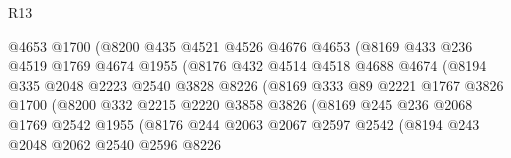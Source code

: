 \begin{lexlean}{R13}
\begin{coremodule}
                            @4653
                            @1700
                            (@8200
                              @435
                              @4521
                              @4526
                              @4676
                              @4653
                              (@8169
                                @433
                                @236
                                @4519
                                @1769
                                @4674
                                @1955
                                (@8176
                                  @432
                                  @4514
                                  @4518
                                  @4688
                                  @4674
                                  (@8194
                                    @335
                                    @2048
                                    @2223
                                    @2540
                                    @3828
                                    @8226
                                    (@8169
                                      @333
                                      @89
                                      @2221
                                      @1767
                                      @3826
                                      @1700
                                      (@8200
                                        @332
                                        @2215
                                        @2220
                                        @3858
                                        @3826
                                        (@8169
                                          @245
                                          @236
                                          @2068
                                          @1769
                                          @2542
                                          @1955
                                          (@8176
                                            @244
                                            @2063
                                            @2067
                                            @2597
                                            @2542
                                            (@8194
                                              @243
                                              @2048
                                              @2062
                                              @2540
                                              @2596
                                              @8226

\end{coremodule}
\end{lexlean}
